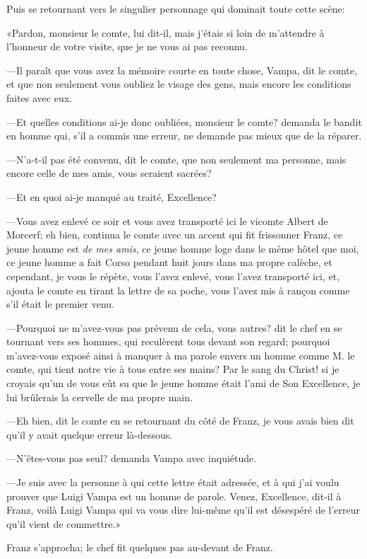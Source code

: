 Puis se retournant vers le singulier personnage qui dominait toute cette scène: 

«Pardon, monsieur le comte, lui dit-il, mais j'étais si loin de m'attendre à l'honneur de votre visite, que je ne vous ai pas reconnu. 

—Il paraît que vous avez la mémoire courte en toute chose, Vampa, dit le comte, et que non seulement vous oubliez le visage des gens, mais encore les conditions faites avec eux. 

—Et quelles conditions ai-je donc oubliées, monsieur le comte? demanda le bandit en homme qui, s'il a commis une erreur, ne demande pas mieux que de la réparer. 

—N'a-t-il pas été convenu, dit le comte, que non seulement ma personne, mais encore celle de mes amis, vous seraient sacrées? 

—Et en quoi ai-je manqué au traité, Excellence? 

—Vous avez enlevé ce soir et vous avez transporté ici le vicomte Albert de Morcerf; eh bien, continua le comte avec un accent qui fit frissonner Franz, ce jeune homme est \textit{de mes amis}, ce jeune homme loge dans le même hôtel que moi, ce jeune homme a fait Corso pendant huit jours dans ma propre calèche, et cependant, je vous le répète, vous l'avez enlevé, vous l'avez transporté ici, et, ajouta le comte en tirant la lettre de sa poche, vous l'avez mis à rançon comme s'il était le premier venu. 

—Pourquoi ne m'avez-vous pas prévenu de cela, vous autres? dit le chef en se tournant vers ses hommes, qui reculèrent tous devant son regard; pourquoi m'avez-vous exposé ainsi à manquer à ma parole envers un homme comme M. le comte, qui tient notre vie à tous entre ses mains? Par le sang du Christ! si je croyais qu'un de vous eût su que le jeune homme était l'ami de Son Excellence, je lui brûlerais la cervelle de ma propre main.  

—Eh bien, dit le comte en se retournant du côté de Franz, je vous avais bien dit qu'il y avait quelque erreur là-dessous. 

—N'êtes-vous pas seul? demanda Vampa avec inquiétude. 

—Je suis avec la personne à qui cette lettre était adressée, et à qui j'ai voulu prouver que Luigi Vampa est un homme de parole. Venez, Excellence, dit-il à Franz, voilà Luigi Vampa qui va vous dire lui-même qu'il est désespéré de l'erreur qu'il vient de commettre.» 

Franz s'approcha; le chef fit quelques pas au-devant de Franz. 

